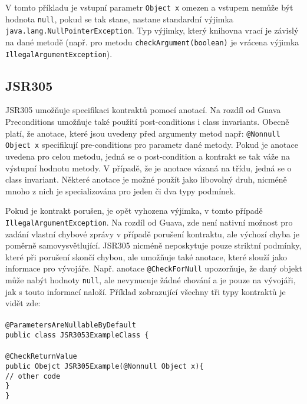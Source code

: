     		V tomto příkladu je vstupní parametr \texttt{Object x} omezen a vstupem nemůže být hodnota \texttt{null}, pokud se tak stane, nastane standardní výjimka \texttt{java.lang.NullPointerException}. Typ výjimky, který knihovna vrací je závislý na dané metodě (např. pro metodu \texttt{checkArgument(boolean)} je vrácena výjimka \texttt{IllegalArgumentException}).
		
		
		\subsection{JSR305}
			JSR305 \cite{jsr305} umožňuje specifikaci kontraktů pomocí anotací. Na rozdíl od Guava Preconditions umožňuje také použití post-conditions i class invariants. Obecně platí, že anotace, které jsou uvedeny před argumenty metod např: \texttt{@Nonnull Object x} specifikují pre-conditions pro parametr dané metody. Pokud je anotace uvedena pro celou metodu, jedná se o post-condition a kontrakt se tak váže na výstupní hodnotu metody. V případě, že je anotace vázaná na třídu, jedná se o class invariant. Některé anotace je možné použít jako libovolný druh, nicméně mnoho z nich je specializována pro jeden či dva typy podmínek. 
			
			Pokud je kontrakt porušen, je opět vyhozena výjimka, v tomto případě \texttt{IllegalArgumentException}. Na rozdíl od Guava, zde není nativní možnost pro zadání vlastní chybové zprávy v případě porušení kontraktu, ale výchozí chyba je poměrně samovysvětlující. JSR305 nicméně neposkytuje pouze striktní podmínky, které při porušení skončí chybou, ale umožňuje také anotace, které slouží jako informace pro vývojáře. Např. anotace \texttt{@CheckForNull} upozorňuje, že daný objekt může nabýt hodnoty \texttt{null}, ale nevynucuje žádné chování a je pouze na vývojáři, jak s touto informací naloží. Příklad zobrazující všechny tři typy kontraktů je vidět zde:\\\\			
			\- \- \- \- \- \texttt{@ParametersAreNullableByDefault}\\
			\- \- \- \- \- \texttt{public class JSR3053ExampleClass \{}\\\\
   			\- \- \- \- \- \- \- \- \- \- \texttt{@CheckReturnValue}\\
    		\- \- \- \- \- \- \- \- \- \- \texttt{public Obejct JSR305Example(@Nonnull Object x)\{}\\
      		\- \- \- \- \- \- \- \- \- \- \- \- \- \- \- \texttt{// other code}\\
    		\- \- \- \- \- \- \- \- \- \- \texttt{\}}\\
			\- \- \- \- \- \texttt{\}}\\
			
